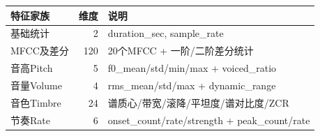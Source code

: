 \begin{tabular}{p{3.0cm}rp{7.8cm}}
\toprule
特征家族 & 维度 & 说明 \\
\midrule
基础统计 & 2 & duration\_sec, sample\_rate \\
MFCC及差分 & 120 & 20个MFCC + 一阶/二阶差分统计 \\
音高Pitch & 5 & f0\_mean/std/min/max + voiced\_ratio \\
音量Volume & 4 & rms\_mean/std/max + dynamic\_range \\
音色Timbre & 24 & 谱质心/带宽/滚降/平坦度/谱对比度/ZCR \\
节奏Rate & 6 & onset\_count/rate/strength + peak\_count/rate \\
\bottomrule
\end{tabular}